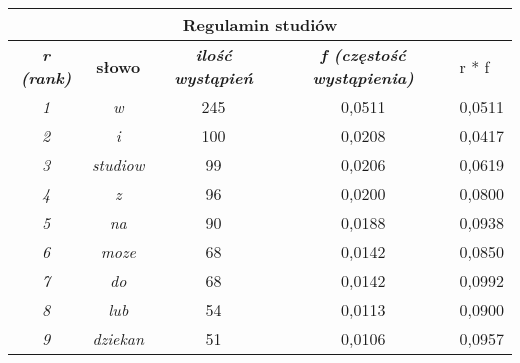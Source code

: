 \documentclass[a4paper]{article}
\begin{document}
\begin{table}
\begin{tabular}{ccc|c|l|}
\hline
\multicolumn{5}{|c|}{\textbf{Regulamin studiów}}                                                                                                                                    \\ \hline
\multicolumn{1}{|c|}{\textit{\textbf{r (rank)}}} & \multicolumn{1}{c|}{\textbf{słowo}}    & \textit{\textbf{ilość wystąpień}} & \textit{\textbf{f (częstość wystąpienia)}} & r * f  \\ \hline
\multicolumn{1}{|c|}{\textit{1}}                 & \multicolumn{1}{c|}{\textit{w}}        & 245                               & 0,0511                                     & 0,0511 \\ \hline
\multicolumn{1}{|c|}{\textit{2}}                 & \multicolumn{1}{c|}{\textit{i}}        & 100                               & 0,0208                                     & 0,0417 \\ \hline
\multicolumn{1}{|c|}{\textit{3}}                 & \multicolumn{1}{c|}{\textit{studiow}}  & 99                                & 0,0206                                     & 0,0619 \\ \hline
\multicolumn{1}{|c|}{\textit{4}}                 & \multicolumn{1}{c|}{\textit{z}}        & 96                                & 0,0200                                     & 0,0800 \\ \hline
\multicolumn{1}{|c|}{\textit{5}}                 & \multicolumn{1}{c|}{\textit{na}}       & 90                                & 0,0188                                     & 0,0938 \\ \hline
\multicolumn{1}{|c|}{\textit{6}}                 & \multicolumn{1}{c|}{\textit{moze}}     & 68                                & 0,0142                                     & 0,0850 \\ \hline
\multicolumn{1}{|c|}{\textit{7}}                 & \multicolumn{1}{c|}{\textit{do}}       & 68                                & 0,0142                                     & 0,0992 \\ \hline
\multicolumn{1}{|c|}{\textit{8}}                 & \multicolumn{1}{c|}{\textit{lub}}      & 54                                & 0,0113                                     & 0,0900 \\ \hline
\multicolumn{1}{|c|}{\textit{9}}                 & \multicolumn{1}{c|}{\textit{dziekan}}  & 51                                & 0,0106                                     & 0,0957 \\ \hline

\end{tabular}
\end{table}
\end{document}
